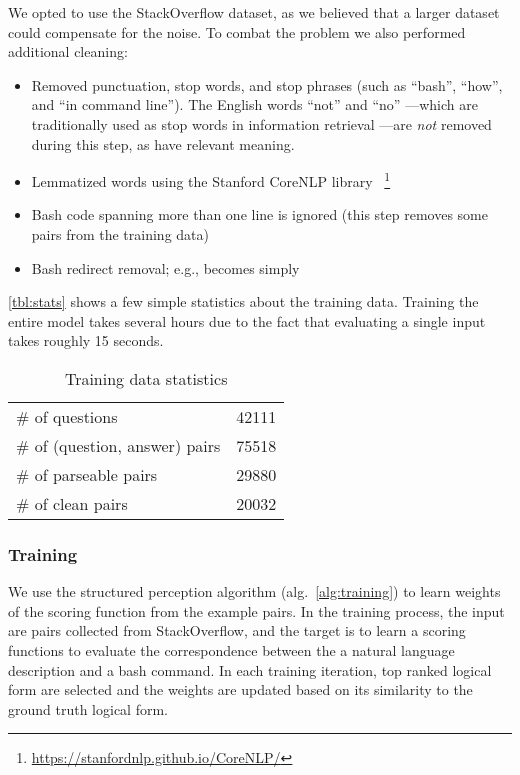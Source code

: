 We opted to use the StackOverflow dataset, as we believed that a larger dataset
could compensate for the noise. To combat the problem we also performed
additional cleaning:
\begin{itemize}
	\item Removed punctuation, stop words, and stop phrases (such as ``bash'',
		``how'', and ``in command line''). The English words ``not'' and ``no''%
		---which are traditionally used as stop words in information retrieval%
		---are \emph{not} removed during this step, as have relevant meaning.
	\item Lemmatized words using the Stanford CoreNLP library~%
		\footnote{\url{https://stanfordnlp.github.io/CoreNLP/}}
	\item Bash code spanning more than one line is ignored (this step removes
		some pairs from the training data)
	\item Bash redirect removal; e.g.,  becomes simply 
\end{itemize}

\autoref{tbl:stats} shows a few simple statistics about the training data.
Training the entire model takes several hours due to the fact that evaluating a
single input takes roughly 15 seconds.

\begin{table}
    \begin{center}
    \begin{tabular}[t]{lr}
        \hline
        \# of questions                & 42111 \\
        \# of (question, answer) pairs & 75518 \\
        \# of parseable pairs          & 29880 \\
        \# of clean pairs              & 20032 \\
        \hline
    \end{tabular}
    \end{center}
    \caption{Training data statistics}
    \label{tbl:stats}
\end{table}

\subsubsection{Training}
\label{subsec:training}

We use the structured perception algorithm (alg.~\ref{alg:training}) to learn weights of the scoring function from the example pairs. In the training process, the input are pairs collected from StackOverflow, and the target is to learn a scoring functions to evaluate the correspondence between the a natural language description and a bash command. In each training iteration, top ranked logical form are selected and the weights are updated based on its similarity to the ground truth logical form.

